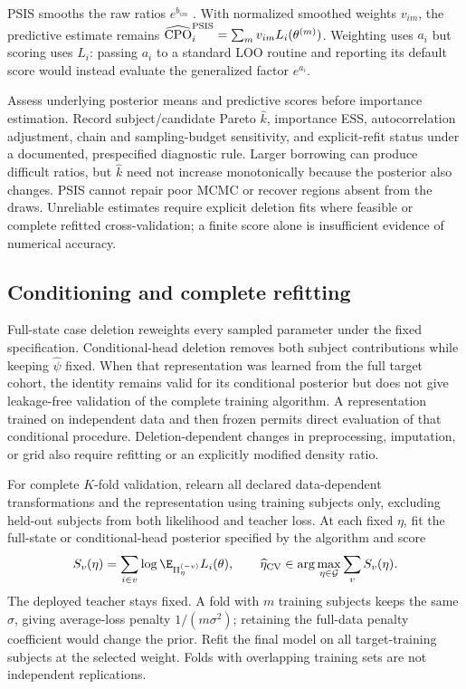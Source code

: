 \documentclass{article} %
\begin{document}
PSIS smooths the raw ratios $e^{b_{im}}$ \citep{vehtari2024}. With normalized smoothed weights $v_{im}$, the predictive estimate remains $\widehat{\mathrm{CPO}}_i^{\rm PSIS}=\sum_m v_{im}L_i(\theta^{(m)})$. Weighting uses $a_i$ but scoring uses $L_i$: passing $a_i$ to a standard LOO routine and reporting its default score would instead evaluate the generalized factor $e^{a_i}$.

Assess underlying posterior means and predictive scores before importance estimation. Record subject/candidate Pareto $\widehat k$, importance ESS, autocorrelation adjustment, chain and sampling-budget sensitivity, and explicit-refit status under a documented, prespecified diagnostic rule. Larger borrowing can produce difficult ratios, but $\widehat k$ need not increase monotonically because the posterior also changes. PSIS cannot repair poor MCMC or recover regions absent from the draws. Unreliable estimates require explicit deletion fits where feasible or complete refitted cross-validation; a finite score alone is insufficient evidence of numerical accuracy.

\subsection{Conditioning and complete refitting}
Full-state case deletion reweights every sampled parameter under the fixed specification. Conditional-head deletion removes both subject contributions while keeping $\widehat\psi$ fixed. When that representation was learned from the full target cohort, the identity remains valid for its conditional posterior but does not give leakage-free validation of the complete training algorithm. A representation trained on independent data and then frozen permits direct evaluation of that conditional procedure. Deletion-dependent changes in preprocessing, imputation, or grid also require refitting or an explicitly modified density ratio.

For complete $K$-fold validation, relearn all declared data-dependent transformations and the representation using training subjects only, excluding held-out subjects from both likelihood and teacher loss. At each fixed $\eta$, fit the full-state or conditional-head posterior specified by the algorithm and score
\[
S_v(\eta)=\sum_{i\in v}\log\E_{\Pi^{(-v)}_\eta}L_i(\theta),\qquad
\widehat\eta_{\rm CV}\in\arg\max_{\eta\in\mathcal G}\sum_v S_v(\eta).
\]
The deployed teacher stays fixed. A fold with $m$ training subjects keeps the same $\sigma$, giving average-loss penalty $1/(m\sigma^2)$; retaining the full-data penalty coefficient would change the prior. Refit the final model on all target-training subjects at the selected weight. Folds with overlapping training sets are not independent replications.
\end{document}

